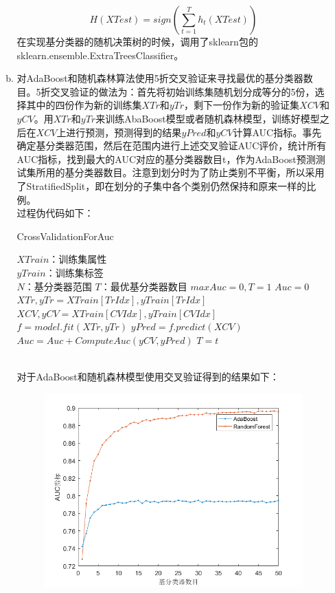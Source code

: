 \documentclass[a4paper,UTF8]{article}
\numberwithin{equation}{section}
\begin{document}
\begin{enumerate}[1.]
\begin{enumerate}[a.]
\begin{equation}
H(XTest) = sign(\sum_{t=1}^{T}h_t(XTest))
\end{equation}
在实现基分类器的随机决策树的时候，调用了sklearn包的sklearn.ensemble.ExtraTreesClassifier。
\item 对AdaBoost和随机森林算法使用5折交叉验证来寻找最优的基分类器数目。5折交叉验证的做法为：首先将初始训练集随机划分成等分的5份，选择其中的四份作为新的训练集$XTr$和$yTr$，剩下一份作为新的验证集$XCV$和$yCV$。用$XTr$和$yTr$来训练AbaBoost模型或者随机森林模型，训练好模型之后在$XCV$上进行预测，预测得到的结果$yPred$和$yCV$计算AUC指标。事先确定基分类器范围，然后在范围内进行上述交叉验证AUC评价，统计所有AUC指标，找到最大的AUC对应的基分类器数目t，作为AdaBoost预测测试集所用的基分类器数目。注意到划分时为了防止类别不平衡，所以采用了StratifiedSplit，即在划分的子集中各个类别仍然保持和原来一样的比例。\\
过程伪代码如下：
\begin{algorithm}[!h]  
	\caption{CrossValidationForAuc}  
	\begin{algorithmic}[1]  
		\Require
		$XTrain$：训练集属性\\
		$yTrain$：训练集标签\\
		$N$：基分类器范围
		\Ensure  
		$T$：最优基分类器数目
		\State $maxAuc = 0, T = 1$
		\State $Auc = 0$
		\State $XTr, yTr = XTrain[TrIdx], yTrain[TrIdx]$
		\State $XCV, yCV = XTrain[CVIdx], yTrain[CVIdx]$
		\State $f = model.fit(XTr, yTr)$
		\State $yPred = f.predict(XCV)$
		\State $Auc = Auc + ComputeAuc(yCV,yPred)$
		\EndFor
		\State $T = t$
		\EndIf
		\EndFor
		\label{code:End3}  
	\end{algorithmic}  
\end{algorithm}\\
对于AdaBoost和随机森林模型使用交叉验证得到的结果如下：
\begin{figure}[!ht]
	\centering
	\includegraphics[scale=0.5]{auc.png}

\end{figure}
\end{enumerate}
\end{enumerate}
\end{document}
